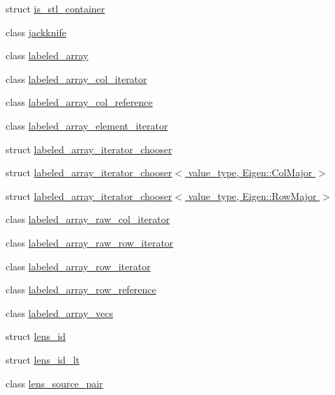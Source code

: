 \begin{DoxyCompactItemize}
\item 
struct \hyperlink{structIceBRG_1_1is__stl__container}{is\+\_\+stl\+\_\+container}
\item 
class \hyperlink{classIceBRG_1_1jackknife}{jackknife}
\item 
class \hyperlink{classIceBRG_1_1labeled__array}{labeled\+\_\+array}
\item 
class \hyperlink{classIceBRG_1_1labeled__array__col__iterator}{labeled\+\_\+array\+\_\+col\+\_\+iterator}
\item 
class \hyperlink{classIceBRG_1_1labeled__array__col__reference}{labeled\+\_\+array\+\_\+col\+\_\+reference}
\item 
class \hyperlink{classIceBRG_1_1labeled__array__element__iterator}{labeled\+\_\+array\+\_\+element\+\_\+iterator}
\item 
struct \hyperlink{namespaceIceBRG_structIceBRG_1_1labeled__array__iterator__chooser}{labeled\+\_\+array\+\_\+iterator\+\_\+chooser}
\item 
struct \hyperlink{namespaceIceBRG_structIceBRG_1_1labeled__array__iterator__chooser_3_01value__type_00_01Eigen_1_1ColMajor_01_4}{labeled\+\_\+array\+\_\+iterator\+\_\+chooser$<$ value\+\_\+type, Eigen\+::\+Col\+Major $>$}
\item 
struct \hyperlink{namespaceIceBRG_structIceBRG_1_1labeled__array__iterator__chooser_3_01value__type_00_01Eigen_1_1RowMajor_01_4}{labeled\+\_\+array\+\_\+iterator\+\_\+chooser$<$ value\+\_\+type, Eigen\+::\+Row\+Major $>$}
\item 
class \hyperlink{classIceBRG_1_1labeled__array__raw__col__iterator}{labeled\+\_\+array\+\_\+raw\+\_\+col\+\_\+iterator}
\item 
class \hyperlink{classIceBRG_1_1labeled__array__raw__row__iterator}{labeled\+\_\+array\+\_\+raw\+\_\+row\+\_\+iterator}
\item 
class \hyperlink{classIceBRG_1_1labeled__array__row__iterator}{labeled\+\_\+array\+\_\+row\+\_\+iterator}
\item 
class \hyperlink{classIceBRG_1_1labeled__array__row__reference}{labeled\+\_\+array\+\_\+row\+\_\+reference}
\item 
class \hyperlink{classIceBRG_1_1labeled__array__vecs}{labeled\+\_\+array\+\_\+vecs}
\item 
struct \hyperlink{structIceBRG_1_1lens__id}{lens\+\_\+id}
\item 
struct \hyperlink{structIceBRG_1_1lens__id__lt}{lens\+\_\+id\+\_\+lt}
\item 
class \hyperlink{classIceBRG_1_1lens__source__pair}{lens\+\_\+source\+\_\+pair}

\end{DoxyCompactItemize}
